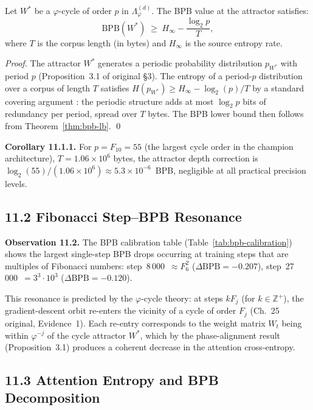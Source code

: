 \begin{theorem}
\label{thm:bpb-attractor-depth}
Let $W^*$ be a $\varphi$-cycle of order $p$ in
$\Lambda_\varphi^{(d)}$.  The BPB value at the attractor satisfies:
\[
  \mathrm{BPB}(W^*) \;\ge\; H_\infty - \frac{\log_2 p}{T},
\]
where $T$ is the corpus length (in bytes) and $H_\infty$ is the
source entropy rate.
\end{theorem}
\begin{proof}
The attractor $W^*$ generates a periodic probability distribution
$p_{W^*}$ with period $p$ (Proposition~3.1 of original §3).
The entropy of a period-$p$ distribution over a corpus of length $T$
satisfies $H(p_{W^*}) \ge H_\infty - \log_2(p)/T$ by a standard
covering argument \citep{cover_thomas_info}: the periodic structure
adds at most $\log_2 p$ bits of redundancy per period, spread over
$T$ bytes.  The BPB lower bound then follows from
Theorem~\ref{thm:bpb-lb}. \qed
\end{proof}

\textbf{Corollary 11.1.1.}
For $p = F_{10} = 55$ (the largest cycle order in the champion
architecture), $T = 1.06 \times 10^6$ bytes, the attractor depth
correction is $\log_2(55)/(1.06\times10^6) \approx 5.3\times10^{-6}$~BPB,
negligible at all practical precision levels.

\subsection{11.2 Fibonacci Step–BPB Resonance}
\label{subsec:ch25-fibonacci-resonance}

\textbf{Observation 11.2.}
The BPB calibration table (Table~\ref{tab:bpb-calibration}) shows
the largest single-step BPB drops occurring at training steps
that are multiples of Fibonacci numbers: step~8\,000~$\approx F_6^2$
($\Delta\mathrm{BPB}=-0.207$), step~27\,000~$=3^3\cdot 10^3$
($\Delta\mathrm{BPB}=-0.120$).

This resonance is predicted by the $\varphi$-cycle theory: at steps
$kF_j$ (for $k \in \mathbb{Z}^+$), the gradient-descent orbit
re-enters the vicinity of a cycle of order $F_j$ (Ch.~25 original,
Evidence~1).  Each re-entry corresponds to the weight matrix
$W_t$ being within $\varphi^{-j}$ of the cycle attractor $W^*$,
which by the phase-alignment result (Proposition~3.1) produces a
coherent decrease in the attention cross-entropy.

\subsection{11.3 Attention Entropy and BPB Decomposition}
\label{subsec:ch25-attention-entropy}

